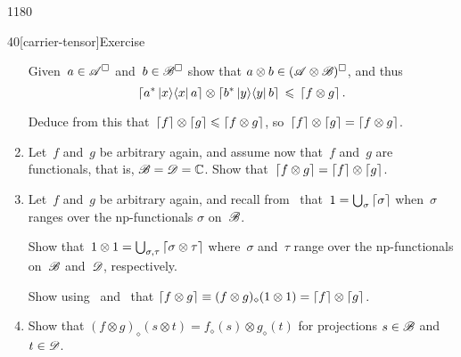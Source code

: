 \begin{parsec}{1180}
\begin{point}{40}[carrier-tensor]{Exercise}
\begin{enumerate}
Given~$a\in\mathscr{A}^\square$ and~$b\in\mathscr{B}^\square$
show that $a\otimes b \in (\mathscr{A}\otimes \mathscr{B})^\square$,
and thus
\begin{equation*}
	\left\lceil a^* \left|x\right>\!\left<x\right|a\right\rceil\otimes
\left\lceil b^* \left|y\right>\!\left<y\right|b\right\rceil \,\leqslant\, \left\lceil f\otimes g\right\rceil.
\end{equation*}

Deduce from this that~$\left\lceil f\right\rceil\otimes \left\lceil g\right\rceil\leqslant \left\lceil f\otimes g\right\rceil$,
so~$\left\lceil f\right\rceil\otimes \left\lceil g\right\rceil= \left\lceil f\otimes g\right\rceil$.
\item
Let~$f$ and~$g$ be arbitrary again,
and assume now that~$f$ and~$g$ are functionals,
that is, $\mathscr{B}=\mathscr{D}=\mathbb{C}$.
Show that~$\left\lceil f\otimes g\right\rceil=\left\lceil f\right\rceil\otimes \left\lceil g\right\rceil$.
\item
Let~$f$ and~$g$ be arbitrary again,
and recall
from~
that~$1=\bigcup_{\sigma}\left\lceil\sigma\right\rceil$
when~$\sigma$ ranges over the np-functionals
$\sigma$ on~$\mathscr{B}$.

Show that~$1\otimes 1 
= \bigcup_{\sigma,\tau}\left\lceil\sigma \otimes \tau\right\rceil$
where~$\sigma$ and~$\tau$
range over the np-functionals
on~$\mathscr{B}$ and~$\mathscr{D}$, respectively.

Show using~
and~
that
$\left\lceil f\otimes g\right\rceil \equiv
(f\otimes g)_\diamond(1\otimes 1)
= \left\lceil f\right\rceil\otimes \left\lceil g\right\rceil$.
\item
Show that $(f\otimes g)_\diamond (s\otimes t)
= f_\diamond(s)\otimes g_\diamond(t)$
for projections
$s\in \mathscr{B}$
and~$t\in \mathscr{D}$.
\end{enumerate}
\spacingfix%
\end{point}%
\end{parsec}%
